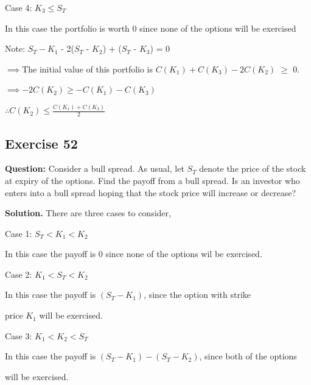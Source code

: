 \documentclass{article}
\begin{document}
\vspace{\baselineskip}

Case 4: $K_3 \leq S_T$

In this case the portfolio is worth 0 since none of the options will be exercised 

Note: $S_T - K_1$ - 2($S_T$ - $K_2$) + ($S_T$ - $K_3$) = 0 

\vspace{\baselineskip}

$\implies $The initial value of this portfolio is $C(K_1) + C(K_3) - 2C(K_2)$ $\geq$ 0.


\vspace{\baselineskip}

$\implies - 2C(K_2) \geq  - C(K_1) - C(K_3)$

\vspace{\baselineskip}

$\therefore C(K_2)\leq \frac{C(K_1)+C(K_3)}{2}$

\newpage

\subsection*{Exercise 52}
\textbf{Question:} Consider a bull spread. As usual, let $S_T$ denote the price of the stock
at expiry of the options. Find the payoff from a bull spread. Is an investor who enters into a bull spread hoping
that the stock price will increase or decrease?

\textbf{Solution.} There are three cases to consider,

\vspace{\baselineskip}

Case 1: $S_T < K_1 < K_2$

In this case the payoff is 0 since none of the options wil be exercised.

\vspace{\baselineskip}

Case 2: $K_1 < S_T < K_2$

In this case the payoff is $(S_T - K_1)$, since the option with strike 

price $K_1$ will be exercised.

\vspace{\baselineskip}

Case 3: $K_1 < K_2 < S_T$

In this case the payoff is $(S_T - K_1) - (S_T - K_2)$, since both of the options 

will be exercised.
\end{document}

